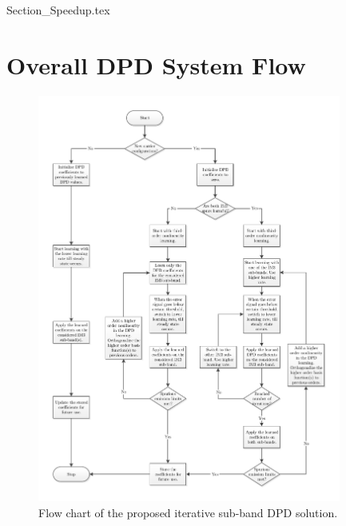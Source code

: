 \documentclass[9pt,conference]{IEEEtran}
\begin{document}
\begin{spacing}{0.88}
{Section_Speedup.tex}

\section{Overall DPD System Flow}
\label{sec:SystemFlow}
\begin{figure}
\centering
\centerline{\includegraphics[width=0.89\textwidth]{./Figures/SystemFlowChart.pdf}}
\caption[]{Flow chart of the proposed iterative sub-band DPD solution.}
\label{fig:SystemFlowChart}
\end{figure}

\end{spacing}
\end{document}
